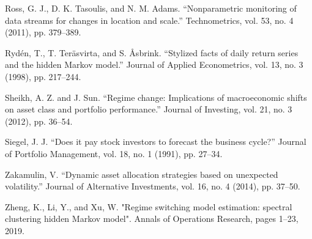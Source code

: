 Ross, G. J., D. K. Tasoulis, and N. M. Adams. “Nonparametric monitoring of data streams for changes in location and scale.” Technometrics, vol. 53, no. 4 (2011), pp. 379–389.

Rydén, T., T. Teräsvirta, and S. Åsbrink. “Stylized facts of daily return series and the hidden Markov model.” Journal of Applied Econometrics, vol. 13, no. 3 (1998), pp. 217–244.

Sheikh, A. Z. and J. Sun. “Regime change: Implications of macroeconomic shifts on asset class and portfolio performance.” Journal of Investing, vol. 21, no. 3 (2012), pp. 36–54.

Siegel, J. J. “Does it pay stock investors to forecast the business cycle?” Journal of Portfolio Management, vol. 18, no. 1 (1991), pp. 27–34.

Zakamulin, V. “Dynamic asset allocation strategies based on unexpected volatility.” Journal of Alternative Investments, vol. 16, no. 4 (2014), pp. 37–50.

Zheng, K., Li, Y., and Xu, W. "Regime switching model estimation: spectral clustering hidden Markov model". Annals of Operations Research, pages 1–23, 2019.









